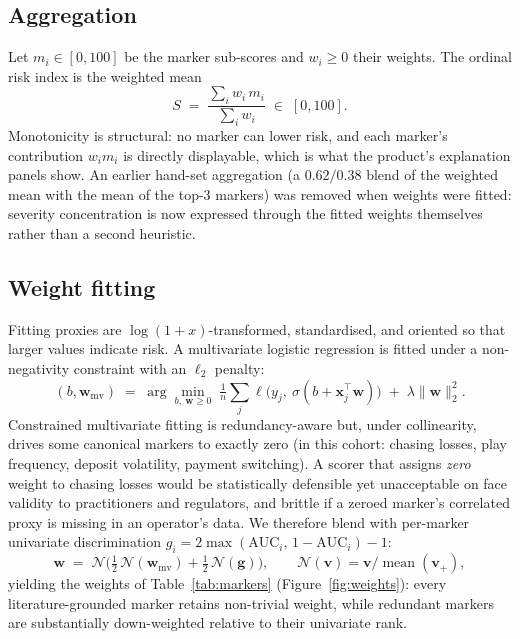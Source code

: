 \documentclass[11pt]{article}
\begin{document}
\subsection{Aggregation}
Let $m_i \in [0,100]$ be the marker sub-scores and $w_i \ge 0$ their weights. The
ordinal risk index is the weighted mean
\begin{equation}
  S \;=\; \frac{\sum_i w_i\, m_i}{\sum_i w_i} \;\in\; [0,100].
  \label{eq:agg}
\end{equation}
Monotonicity is structural: no marker can lower risk, and each marker's contribution
$w_i m_i$ is directly displayable, which is what the product's explanation panels show.
An earlier hand-set aggregation (a $0.62/0.38$ blend of the weighted mean with the mean
of the top-3 markers) was removed when weights were fitted: severity concentration is
now expressed through the fitted weights themselves rather than a second heuristic.

\subsection{Weight fitting}\label{sec:fitting}
Fitting proxies are $\log(1{+}x)$-transformed, standardised, and oriented so that
larger values indicate risk. A multivariate logistic regression is fitted under a
non-negativity constraint with an $\ell_2$ penalty:
\begin{equation}
  (b, \mathbf{w}_{\mathrm{mv}}) \;=\;
  \arg\min_{b,\ \mathbf{w}\ge 0}\;
  \tfrac{1}{n}\textstyle\sum_j \ell\!\big(y_j,\ \sigma(b + \mathbf{x}_j^\top\mathbf{w})\big)
  \;+\; \lambda \lVert \mathbf{w} \rVert_2^2 .
  \label{eq:nnlogit}
\end{equation}
Constrained multivariate fitting is redundancy-aware but, under collinearity, drives
some canonical markers to exactly zero (in this cohort: chasing losses, play frequency,
deposit volatility, payment switching). A scorer that assigns \emph{zero} weight to
chasing losses would be statistically defensible yet unacceptable on face validity to
practitioners and regulators, and brittle if a zeroed marker's correlated proxy is
missing in an operator's data. We therefore blend with per-marker univariate
discrimination $g_i = 2\max(\mathrm{AUC}_i,\,1{-}\mathrm{AUC}_i) - 1$:
\begin{equation}
  \mathbf{w} \;=\; \mathcal{N}\!\Big( \tfrac{1}{2}\,\mathcal{N}(\mathbf{w}_{\mathrm{mv}})
  + \tfrac{1}{2}\,\mathcal{N}(\mathbf{g}) \Big),
  \qquad
  \mathcal{N}(\mathbf{v}) = \mathbf{v} \big/ \operatorname{mean}(\mathbf{v}_{+}),
  \label{eq:blend}
\end{equation}
yielding the weights of Table~\ref{tab:markers} (Figure~\ref{fig:weights}): every
literature-grounded marker retains non-trivial weight, while redundant markers are
substantially down-weighted relative to their univariate rank.
\end{document}
